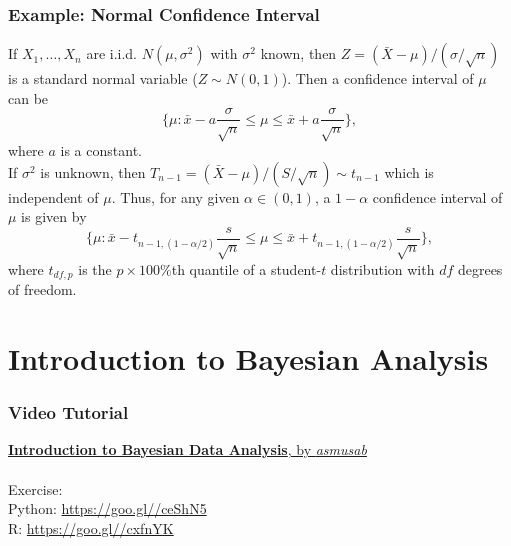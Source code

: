 \documentclass{beamer}
\begin{document}
\begin{frame}
\frametitle{Example: Normal Confidence Interval}
If $X_1,\ldots,X_n$ are i.i.d. $N(\mu,\sigma^2)$ with $\sigma^2$ known, then $Z=(\bar{X}-\mu)/(\sigma/\sqrt{n})$ is a standard normal variable ($Z \sim N(0,1)$). Then a confidence interval of $\mu$ can be
$$
\{\mu: \bar{x}-a\frac{\sigma}{\sqrt{n}} \leq \mu \leq \bar{x}+a\frac{\sigma}{\sqrt{n}}\},
$$
where $a$ is a constant. \\
If $\sigma^2$ is unknown, then $T_{n-1}=(\bar{X}-\mu)/(S/\sqrt{n}) \sim t_{n-1}$ which is independent of $\mu$. Thus, for any given $\alpha \in (0,1)$, a $1-\alpha$ confidence interval of $\mu$ is given by
$$
\{\mu: \bar{x}-t_{n-1,(1-\alpha/2)}\frac{s}{\sqrt{n}} \leq \mu \leq \bar{x}+t_{n-1,(1-\alpha/2)}\frac{s}{\sqrt{n}}\},
$$
where $t_{df,p}$ is the $p\times 100\%$th quantile of a student-$t$ distribution with $df$ degrees of freedom.
\end{frame}







\section{Introduction to Bayesian Analysis}
\begin{frame}
\frametitle{Video Tutorial}
\href{https://youtu.be/3OJEae7Qb_o?t=3m7s}{\textbf{Introduction to Bayesian Data Analysis}, by \textit{asmusab}}
\\~\\
Exercise:\\
Python: \url{https://goo.gl//ceShN5}\\
R: \url{https://goo.gl//cxfnYK}
\end{frame}
\end{document}
